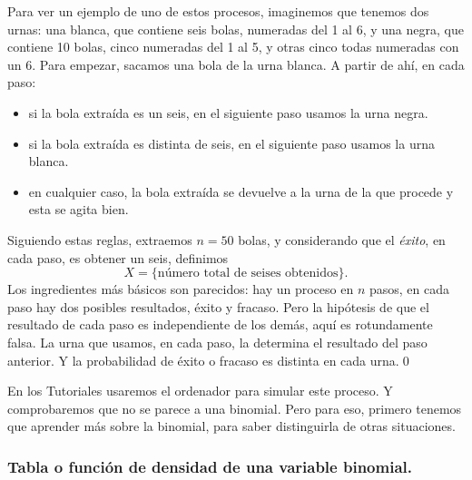 \begin{ejemplo}
\label{cap05:ejem:ProcesoNoBinomial}
    Para ver un ejemplo de uno de estos procesos, imaginemos que tenemos dos urnas: una blanca, que contiene seis bolas, numeradas del 1 al 6, y una negra, que contiene 10 bolas, cinco numeradas del 1 al 5, y otras cinco todas numeradas con un 6. Para empezar, sacamos una bola de la urna blanca. A partir de ahí, en cada paso:
      \begin{itemize}
        \item si la bola extraída es un seis, en el siguiente paso usamos la urna negra.
        \item si la bola extraída es distinta de seis, en el siguiente paso usamos la urna blanca.
        \item en cualquier caso, la bola extraída se devuelve a la urna de la que procede y esta se agita bien.
      \end{itemize}
    Siguiendo estas reglas, extraemos $n=50$ bolas, y considerando que el {\em éxito}, en cada paso, es obtener un seis, definimos
        \[X=\{\mbox{número total de seises obtenidos}\}.\]
    Los ingredientes más básicos son parecidos: hay un proceso en $n$ pasos, en cada paso hay dos posibles resultados, éxito y fracaso. Pero la hipótesis de que el resultado de cada paso es independiente de los demás, aquí es rotundamente falsa. La urna que usamos, en cada paso, la determina el resultado del paso anterior. Y la probabilidad de éxito o fracaso es distinta en cada urna.\qed
\end{ejemplo}
En los Tutoriales usaremos el ordenador para simular este proceso. Y comprobaremos que no se parece a una binomial. Pero para eso, primero tenemos que aprender más sobre la binomial, para saber distinguirla de otras situaciones.


\subsubsection*{Tabla o función de densidad de una variable binomial.}
\label{cap05:subsubsec:tablaFuncionDensidadBinomial}

